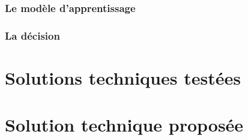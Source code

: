 \subsubsection{Le modèle d'apprentissage}
\label{Automatisation du processus d'investigation: Achitecture High Level du système proposé: Le modèle d'apprentissage}

\subsubsection{La décision}
\label{Automatisation du processus d'investigation: Achitecture High Level du système proposé: La décision}



\section{Solutions techniques testées}
\label{Automatisation du processus d'investigation: Solutions techniques testées}




\section{Solution technique proposée}
\label{Automatisation du processus d'investigation: Solution technique proposée}

